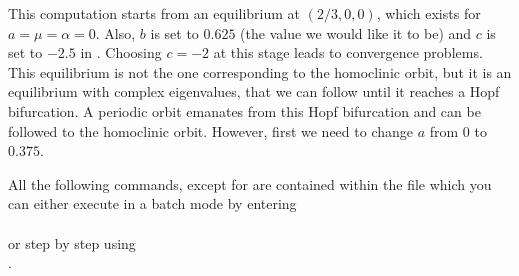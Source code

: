 This computation starts from an equilibrium at $(2/3,0,0)$, which
exists for $a=\mu=\alpha=0$. Also, $b$ is set to $0.625$ (the value
we would like it to be) and $c$ is set to $-2.5$ in .
Choosing $c=-2$ at this stage leads to convergence problems.
This equilibrium is not the one corresponding to the homoclinic orbit,
but it is an equilibrium with complex eigenvalues, that we can follow
until it reaches a Hopf bifurcation. A periodic orbit emanates from 
this Hopf bifurcation and can be followed to the homoclinic orbit.
However, first we need to change $a$ from $0$ to $0.375$.

All the following commands, except for 
are contained within the file  which you can 
either execute in a batch mode by entering\\
\\
or step by step using\\
.

